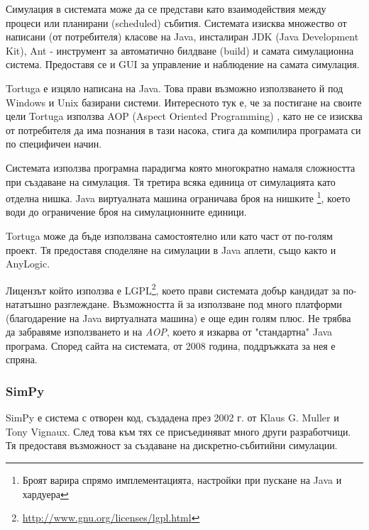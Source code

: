 				Симулация в системата може да се представи като взаимодействия между процеси или планирани (scheduled) събития.					Системата изисква множество от написани (от потребителя) класове на Java, инсталиран JDK 
				(Java Development Kit), Ant - инструмент за автоматично билдване (build) и 
				самата симулационна система. Предоставя се и GUI за управление и наблюдение на самата симулация.
			
			
				Tortuga е изцяло написана на Java. Това прави възможно използването й под Windows и Unix базирани системи.
				Интересното тук е, че за постигане на своите цели Tortuga използва AOP (Aspect Oriented Programming)
				\cite{AOP}, като не се изисква от потребителя да има познания в тази насока, стига да компилира 
				програмата си по специфичен начин. 			
			
			
				Системата използва програмна парадигма която многократно намаля сложността при създаване на симулация.
				Тя третира всяка единица от симулацията като отделна нишка. Java виртуалната машина ограничава броя на нишките
				\footnote{Броят варира спрямо имплементацията, настройки при пускане на Java и хардуера}, 
				което води до ограничение броя на симулационните единици.
			
			
	 			Tortuga може да бъде използвана самостоятелно или като част от по-голям проект. 
	 			Тя предоставя споделяне на симулации в Java аплети, също както и AnyLogic.
 			
 			
	 			Лицензът който използва е LGPL\footnote{\url{http://www.gnu.org/licenses/lgpl.html}}, 
	 			което прави системата добър кандидат за по-нататъшно разглеждане.
	 			Възможността й за използване под много платформи (благодарение на Java виртуалната машина) е 
	 			още един голям плюс.
	 			Не трябва да забравяме използването и на \emph{AOP}, което я изкарва от "стандартна" Java програма.
	 			Според сайта на системата, от 2008 година, поддръжката за нея е спряна. \cite{Tortuga}
					
		\subsubsection{SimPy}
			
			SimPy е система с отворен код, създадена през 2002 г. от Klaus G. Muller и Tony Vignaux. След това
			към тях се присъединяват много други разработчици. 
			Тя предоставя възможност за създаване на дискретно-събитийни симулации.
			
